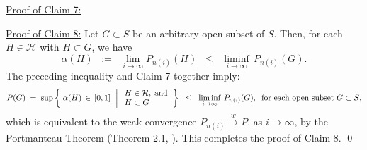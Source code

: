 \vskip 0.5cm
\noindent
\underline{Proof of Claim 7:}\quad

\vskip 0.5cm
\noindent
\underline{Proof of Claim 8:}\quad
Let $G \subset S$ be an arbitrary open subset of $S$.
Then, for each $H \in \mathcal{H}$ with $H \subset G$, we have
\begin{equation*}
\alpha(H)
\;\; := \;\; \lim_{i\rightarrow\infty}P_{n(i)}(H)
\;\; \leq \;\; \liminf_{i\rightarrow\infty}\,P_{n(i)}(G).
\end{equation*}
The preceding inequality and Claim 7 together imply:
\begin{equation*}
P(G)
\; = \;
\sup\left\{\;
\alpha(H) \,\in\, [0,1]
\,\;\left\vert\;
\begin{array}{l} H \in \mathcal{H}, \;\textnormal{and} \\ H \subset G \end{array}
\right.
\right\}
\;\;\leq\;\;
\liminf_{i\rightarrow\infty}\,P_{n(i)}(G),
\;\;
\textnormal{for each open subset $G \subset S$},
\end{equation*}
which is equivalent to the weak convergence
$P_{n(i)} \overset{w}{\longrightarrow} P$, as $i \longrightarrow \infty$,
by the Portmanteau Theorem (Theorem 2.1, \cite{Billingsley1999}).
This completes the proof of Claim 8.
\qed

\renewcommand{\theenumi}{\roman{enumi}}
\renewcommand{\labelenumi}{\textnormal{(\theenumi)}$\;\;$}


